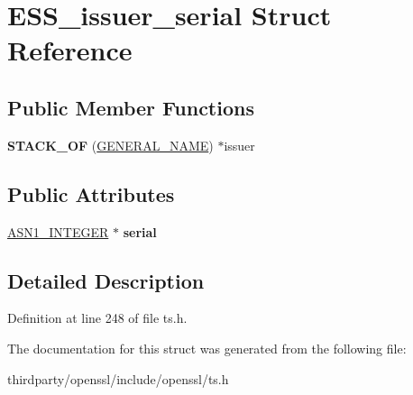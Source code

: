 \hypertarget{struct_e_s_s__issuer__serial}{}\section{E\+S\+S\+\_\+issuer\+\_\+serial Struct Reference}
\label{struct_e_s_s__issuer__serial}
\subsection*{Public Member Functions}
\begin{DoxyCompactItemize}
\item 
\mbox{\label{struct_e_s_s__issuer__serial_af82fe616c7258f0d04c344f002019613}} 
{\bfseries S\+T\+A\+C\+K\+\_\+\+OF} (\hyperlink{struct_g_e_n_e_r_a_l___n_a_m_e__st}{G\+E\+N\+E\+R\+A\+L\+\_\+\+N\+A\+ME}) $\ast$issuer
\end{DoxyCompactItemize}
\subsection*{Public Attributes}
\begin{DoxyCompactItemize}
\item 
\mbox{\label{struct_e_s_s__issuer__serial_a7843f6a7d665ee063b624b3d57d16719}} 
\hyperlink{structasn1__string__st}{A\+S\+N1\+\_\+\+I\+N\+T\+E\+G\+ER} $\ast$ {\bfseries serial}
\end{DoxyCompactItemize}


\subsection{Detailed Description}


Definition at line 248 of file ts.\+h.



The documentation for this struct was generated from the following file\+:\begin{DoxyCompactItemize}
\item 
thirdparty/openssl/include/openssl/ts.\+h\end{DoxyCompactItemize}
